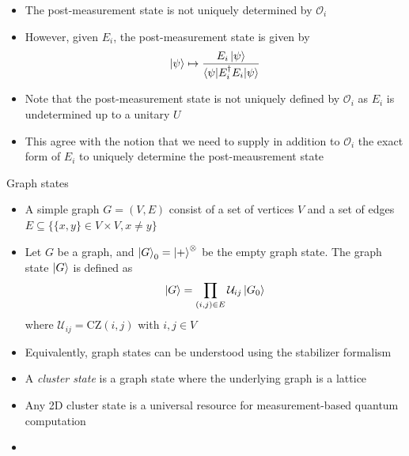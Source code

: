 \documentclass[aspectratio=169,xcolor=dvipsnames, t]{beamer}
\begin{document}
\begin{frame}
    \begin{itemize}
        \item The post-measurement state is not uniquely determined by $\mathcal O_i$
        \item However, given $E_i$, the post-measurement state is given by 
        \begin{align*}
            \ket{\psi} \mapsto \frac{E_i \ket{\psi}}{\braket{\psi|E_i^\dagger E_i|\psi}}
        \end{align*}
        \item Note that the post-measurement state is not uniquely defined by $\mathcal O_i$ as $E_i$ is undetermined up to a unitary $U$
        \item This agree with the notion that we need to supply in addition to $\mathcal O_i$ the exact form of $E_i$ to uniquely determine the post-meausrement state
    \end{itemize}
\end{frame}

\begin{frame}{Graph states}
    \begin{itemize}
        \item A simple graph $G=(V,E)$ consist of a set of vertices $V$ and a set of edges $E\subseteq \{\{x,y\} \in V\times V, x\neq y\}$
        \item Let $G$ be a graph, and $\ket{G}_0 = \ket{+}^{\otimes}$ be the empty graph state. The graph state $\ket{G}$ is defined as
        \begin{align*}
            \ket{G} = \prod_{(i,j) \in E} \mathcal U_{ij} \ket{G_0}
        \end{align*} 
        where $\mathcal U_{ij} =\text{CZ}(i,j)$ with $i,j \in V$  
        \item Equivalently, graph states can be understood using the stabilizer formalism
    \end{itemize}
\end{frame}

\begin{frame}
    \begin{itemize}
        \item A \textit{cluster state} is a graph state where the underlying graph is a lattice
        \item Any 2D cluster state is a universal resource for measurement-based quantum computation
        \item 
    \end{itemize}
\end{frame}
\end{document}
